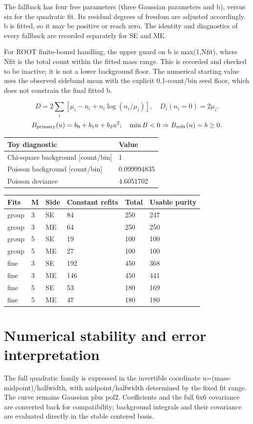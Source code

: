 \documentclass[10pt,a4paper]{article}
\begin{document}
The fallback has four free parameters (three Gaussian parameters and b), versus six for the quadratic fit. Its residual degrees of freedom are adjusted accordingly. b is fitted, so it may be positive or reach zero. The identity and diagnostics of every fallback are recorded separately for SE and ME.

For ROOT finite-bound handling, the upper guard on b is max(1,Nfit), where Nfit is the total count within the fitted mass range. This is recorded and checked to be inactive; it is not a lower background floor. The numerical starting value uses the observed sideband mean with the explicit 0.1-count/bin seed floor, which does not constrain the final fitted b.

\[D=2\sum_i[\mu_i-n_i+n_i\log(n_i/\mu_i)],\quad D_i(n_i=0)=2\mu_i.\]
\[B_{\rm primary}(u)=b_0+b_1u+b_2u^2;\quad \min B<0\Rightarrow B_{\rm refit}(u)=b\geq0.\]
{\small\setlength{\tabcolsep}{3pt}\begin{longtable}{ll}\toprule
Toy diagnostic & Value\\\midrule\endhead
Chi-square background [count/bin] & 1\\
Poisson background [count/bin] & 0.099994835\\
Poisson deviance & 4.6051702\\
\bottomrule\end{longtable}}
{\small\setlength{\tabcolsep}{3pt}\begin{longtable}{llllll}\toprule
Fits & M & Side & Constant refits & Total & Usable purity\\\midrule\endhead
group & 3 & SE & 84 & 250 & 247\\
group & 3 & ME & 64 & 250 & 250\\
group & 5 & SE & 19 & 100 & 100\\
group & 5 & ME & 27 & 100 & 100\\
fine & 3 & SE & 192 & 450 & 368\\
fine & 3 & ME & 146 & 450 & 441\\
fine & 5 & SE & 53 & 180 & 169\\
fine & 5 & ME & 47 & 180 & 180\\
\bottomrule\end{longtable}}
\section*{Numerical stability and error interpretation}
The full quadratic family is expressed in the invertible coordinate u=(mass-midpoint)/halfwidth, with midpoint/halfwidth determined by the fixed fit range. The curve remains Gaussian plus pol2. Coefficients and the full 6x6 covariance are converted back for compatibility; background integrals and their covariance are evaluated directly in the stable centered basis.
\end{document}
